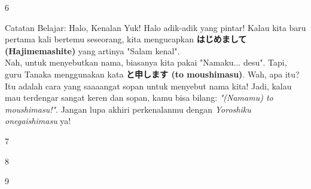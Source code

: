 \begin{convobox}{6}
    \noindent

    \vspace{1.5em}
\end{convobox}

\begin{lessonbox}{Catatan Belajar: Halo, Kenalan Yuk!}
    Halo adik-adik yang pintar! Kalau kita baru pertama kali bertemu seseorang, kita mengucapkan \textbf{はじめまして (Hajimemashite)} yang artinya "Salam kenal". \\
    
    Nah, untuk menyebutkan nama, biasanya kita pakai "Namaku... desu". Tapi, guru Tanaka menggunakan kata \textbf{と申します (to moushimasu)}. Wah, apa itu? Itu adalah cara yang saaaangat sopan untuk menyebut nama kita! Jadi, kalau mau terdengar sangat keren dan sopan, kamu bisa bilang: \textit{"(Namamu) to moushimasu!"}. Jangan lupa akhiri perkenalanmu dengan \textit{Yoroshiku onegaishimasu} ya!
\end{lessonbox}

\begin{convobox}{7}
    \noindent

    \vspace{1.5em}
\end{convobox}

\begin{convobox}{8}
    \noindent
      
      

    \vspace{1.5em}
\end{convobox}

\begin{convobox}{9}
    \noindent

    \vspace{1.5em}
\end{convobox}

